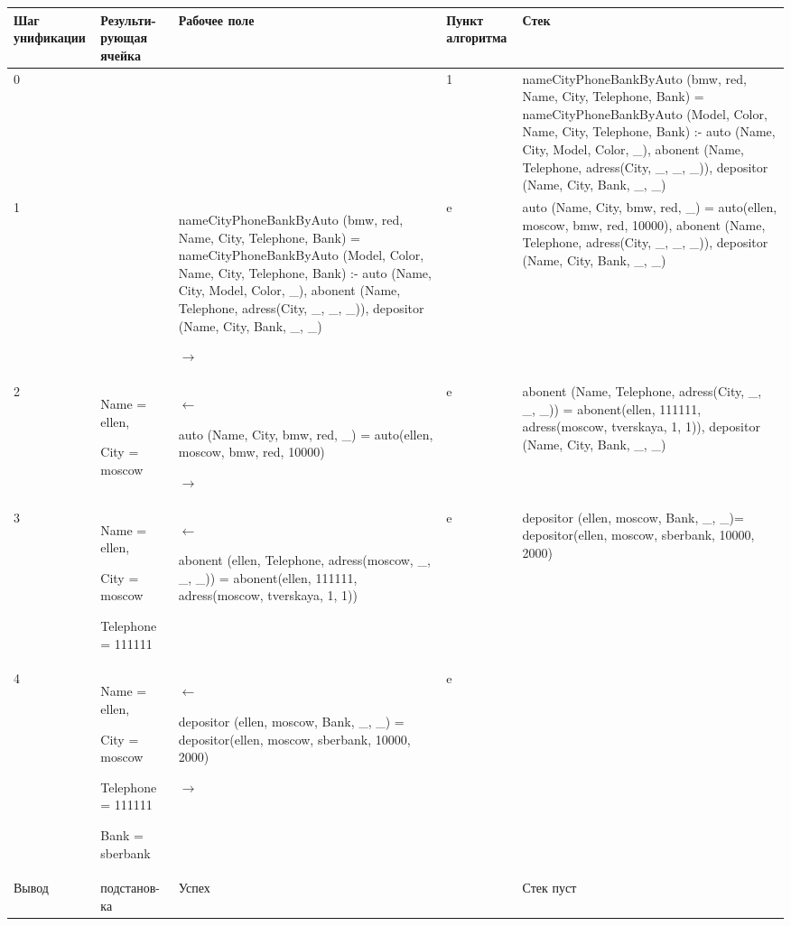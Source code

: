 \documentclass[a4paper,14pt]{extreport} %
\begin{document}
\begin{longtable}{|p{1.2cm}|p{2.4cm}|p{6cm}|p{1.2 cm}|p{6cm}|}
	\hline
 	Шаг унификации & Результи-рующая ячейка  & Рабочее поле & Пункт алгоритма & Стек \\ \hline
	0& & &1& nameCityPhoneBankByAuto (bmw, red, Name, City, Telephone, Bank) = nameCityPhoneBankByAuto (Model, Color, Name, City, Telephone, Bank) :- auto (Name, City, Model, Color, \_), abonent (Name, Telephone, adress(City, \_, \_, \_)), depositor (Name, City, Bank, \_, \_)  \\ \hline
	1& & nameCityPhoneBankByAuto (bmw, red, Name, City, Telephone, Bank) = nameCityPhoneBankByAuto (Model, Color, Name, City, Telephone, Bank) :- auto (Name, City, Model, Color, \_), abonent (Name, Telephone, adress(City, \_, \_, \_)), depositor (Name, City, Bank, \_, \_) 
	
	$\rightarrow$ &e& auto (Name, City, bmw, red, \_) = auto(ellen, moscow, bmw, red, 10000), abonent (Name, Telephone, adress(City, \_, \_, \_)), depositor (Name, City, Bank, \_, \_) \\ \hline
	2 & Name = ellen, 
	
	City = moscow & $\leftarrow$ 
	
	auto (Name, City, bmw, red, \_) = auto(ellen, moscow, bmw, red, 10000)
	
	$\rightarrow$ & e & abonent (Name, Telephone, adress(City, \_, \_, \_)) = abonent(ellen, 111111, adress(moscow, tverskaya, 1, 1)), depositor (Name, City, Bank, \_, \_) \\ \hline
	3& Name = ellen, 
	
	City = moscow
	
	Telephone = 111111 & $\leftarrow$ 
	
	abonent (ellen, Telephone, adress(moscow, \_, \_, \_)) = abonent(ellen, 111111, adress(moscow, tverskaya, 1, 1))
	&e & depositor (ellen, moscow, Bank, \_, \_)= depositor(ellen, moscow, sberbank, 10000, 2000) \\ \hline
	
	4& Name = ellen, 
	
	City = moscow
	
	Telephone = 111111 
	
	Bank = sberbank & $\leftarrow$ 
	
	depositor (ellen, moscow, Bank, \_, \_) = depositor(ellen, moscow, sberbank, 10000, 2000)
	
	$\rightarrow$ &e & \\ \hline
	Вывод & подстанов-ка & Успех &  & Стек пуст \\ \hline
\end{longtable}
\end{document}
